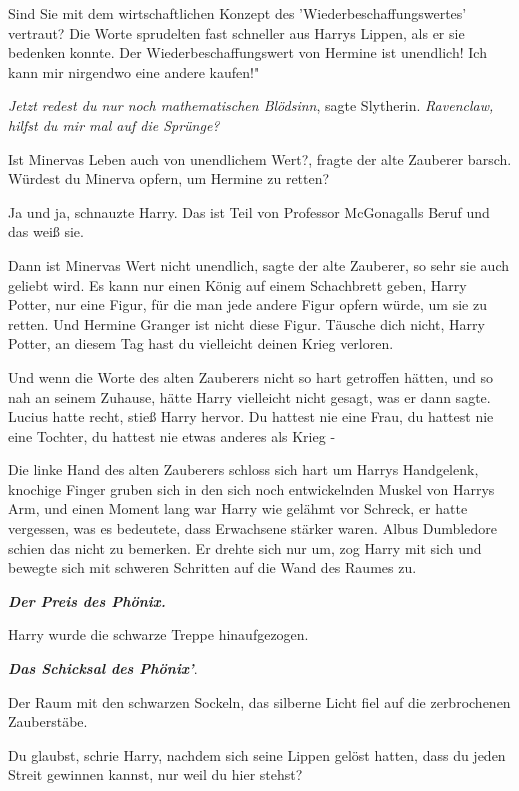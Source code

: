 \glqq Sind Sie mit dem wirtschaftlichen Konzept des 'Wiederbeschaffungswertes'
vertraut?\grqq{} Die Worte sprudelten fast schneller aus Harrys Lippen, als er
sie bedenken konnte. \glqq Der Wiederbeschaffungswert von Hermine ist unendlich!
Ich kann mir nirgendwo eine andere kaufen!"

\emph{Jetzt redest du nur noch mathematischen Blödsinn}, sagte Slytherin.
\emph{Ravenclaw, hilfst du mir mal auf die Sprünge?}

\glqq Ist Minervas Leben auch von unendlichem Wert?\grqq{}, fragte der alte
Zauberer barsch. \glqq Würdest du Minerva opfern, um Hermine zu retten?\grqq{}

\glqq Ja und ja\grqq{}, schnauzte Harry. \glqq Das ist Teil von Professor
McGonagalls Beruf und das weiß sie.\grqq{}

\glqq Dann ist Minervas Wert nicht unendlich\grqq{}, sagte der alte Zauberer,
\glqq so sehr sie auch geliebt wird. Es kann nur einen König auf einem
Schachbrett geben, Harry Potter, nur eine Figur, für die man jede andere Figur
opfern würde, um sie zu retten. Und Hermine Granger ist nicht diese Figur.
Täusche dich nicht, Harry Potter, an diesem Tag hast du vielleicht deinen Krieg
verloren.\grqq{}

Und wenn die Worte des alten Zauberers nicht so hart getroffen hätten, und so
nah an seinem Zuhause, hätte Harry vielleicht nicht gesagt, was er dann sagte.
\glqq Lucius hatte recht\grqq{}, stieß Harry hervor. \glqq Du hattest nie eine
Frau, du hattest nie eine Tochter, du hattest nie etwas anderes als Krieg
-\grqq{}

Die linke Hand des alten Zauberers schloss sich hart um Harrys Handgelenk,
knochige Finger gruben sich in den sich noch entwickelnden Muskel von Harrys
Arm, und einen Moment lang war Harry wie gelähmt vor Schreck, er hatte
vergessen, was es bedeutete, dass Erwachsene stärker waren. Albus Dumbledore
schien das nicht zu bemerken. Er drehte sich nur um, zog Harry mit sich und
bewegte sich mit schweren Schritten auf die Wand des Raumes zu.

\glqq \textbf{\emph{Der Preis des Phönix.}}\grqq{}

Harry wurde die schwarze Treppe hinaufgezogen.

\glqq \textbf{\emph{Das Schicksal des Phönix'}}.\grqq{}

Der Raum mit den schwarzen Sockeln, das silberne Licht fiel auf die zerbrochenen
Zauberstäbe.

\glqq Du glaubst\grqq{}, schrie Harry, nachdem sich seine Lippen gelöst hatten,
\glqq dass du jeden Streit gewinnen kannst, nur weil du hier stehst?\grqq{}

